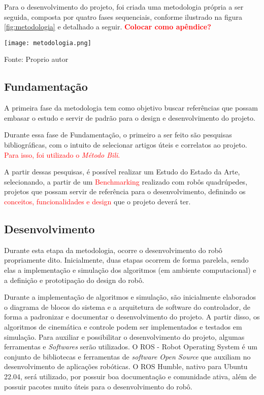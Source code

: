 \documentclass[../main.tex]{subfiles}
\begin{document}
  Para o desenvolvimento do projeto, foi criada uma metodologia própria a ser seguida, composta por quatro fases sequenciais, conforme ilustrado na figura \ref{fig:metodologia} e detalhado a seguir. \textbf{\textcolor{red}{Colocar como apêndice?}}

  \begin{figure*}[h]
    \centering
    \caption{Metodologia}
    \texttt{[image: metodologia.png]}

    Fonte: Proprio autor
    \label{fig:metodologia}
  \end{figure*}

  \subsection{Fundamentação}
  A primeira fase da metodologia tem como objetivo buscar referências que possam embasar o estudo e servir de padrão para o design e desenvolvimento do projeto.

  Durante essa fase de Fundamentação, o primeiro a ser feito são pesquisas bibliográficas, com o intuito de selecionar artigos úteis e correlatos ao projeto. \textcolor{red}{Para isso, foi utilizado o \textit{Método Bili}.}

  A partir dessas pesquisas, é possível realizar um Estudo do Estado da Arte, selecionando, a partir de um \textcolor{red}{Benchmarking} realizado com robôs quadrúpedes, projetos que possam servir de referência para o desenvolvimento, definindo os \textcolor{red}{conceitos, funcionalidades e design} que o projeto deverá ter.

  \subsection{Desenvolvimento}
  Durante esta etapa da metodologia, ocorre o desenvolvimento do robô propriamente dito. Inicialmente, duas etapas ocorrem de forma parelela, sendo elas a implementação e simulação dos algoritmos (em ambiente computacional) e a definição e prototipação do design do robô.

  Durante a implementação de algoritmos e simulação, são inicialmente elaborados o diagrama de blocos do sistema e a arquitetura de software do controlador, de forma a padronizar e documentar o desenvolvimento do projeto. A partir disso, os algoritmos de cinemática e controle podem ser implementados e testados em simulação. Para auxiliar e possibilitar o desenvolvimento do projeto, algumas ferramentas e \textit{Softwares} serão utilizados. O ROS - Robot Operating System é um conjunto de bibliotecas e ferramentas de \textit{software Open Source} que auxiliam no desenvolvimento de aplicações robóticas. O ROS Humble, nativo para Ubuntu 22.04, será utilizado, por possuir boa documentação e comunidade ativa, além de possuir pacotes muito úteis para o desenvolvimento do robô. 
\end{document}
